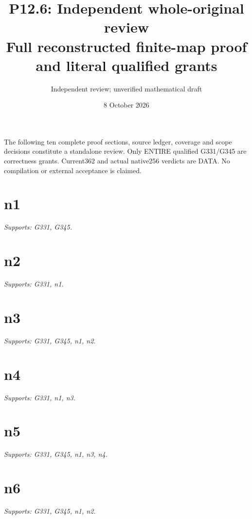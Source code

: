 \documentclass[11pt]{article}
\title{P12.6: Independent whole-original review\\Full reconstructed finite-map proof and literal qualified grants}
\author{Independent review; unverified mathematical draft}
\date{8 October 2026}
\begin{document}
\maketitle
The following ten complete proof sections, source ledger, coverage and scope decisions constitute a standalone review. Only ENTIRE qualified G331/G345 are correctness grants. Current362 and actual native256 verdicts are DATA. No compilation or external acceptance is claimed.
\tableofcontents

\section{n1}
\textit{Supports: G331, G345.}
\begin{ReviewBody}
\end{ReviewBody}

\section{n2}
\textit{Supports: G331, n1.}
\begin{ReviewBody}
\end{ReviewBody}

\section{n3}
\textit{Supports: G331, G345, n1, n2.}
\begin{ReviewBody}
\end{ReviewBody}

\section{n4}
\textit{Supports: G331, n1, n3.}
\begin{ReviewBody}
\end{ReviewBody}

\section{n5}
\textit{Supports: G331, G345, n1, n3, n4.}
\begin{ReviewBody}
\end{ReviewBody}

\section{n6}
\textit{Supports: G331, G345, n1, n2.}
\begin{ReviewBody}
\end{ReviewBody}
\end{document}
